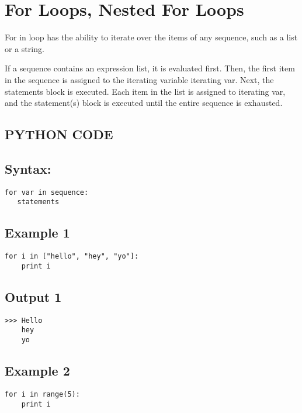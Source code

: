 \chapter{For Loops, Nested For Loops}
For in loop has the ability to iterate over the items of any sequence, such as a list or a string.

If a sequence contains an expression list, it is evaluated first. Then, the first item in the sequence is assigned to the iterating variable iterating var. Next, the statements block is executed. Each item in the list is assigned to iterating var, and the statement(s) block is executed until the entire sequence is exhausted.


\normalsize

\section{\textbf{PYTHON CODE}}

\section{\textbf{Syntax:}}
\begin{verbatim}
for var in sequence:
   statements
\end{verbatim}
   
\section{Example 1}   
\begin{shaded}
\begin{verbatim}
for i in ["hello", "hey", "yo"]:
    print i
\end{verbatim}
\end{shaded}

\section{Output 1}
\begin{shaded}
\begin{verbatim}
>>> Hello
    hey
    yo
\end{verbatim}
\end{shaded}

\section{Example 2}   
\begin{shaded}
\begin{verbatim}
for i in range(5):
    print i
\end{verbatim}
\end{shaded}
    
